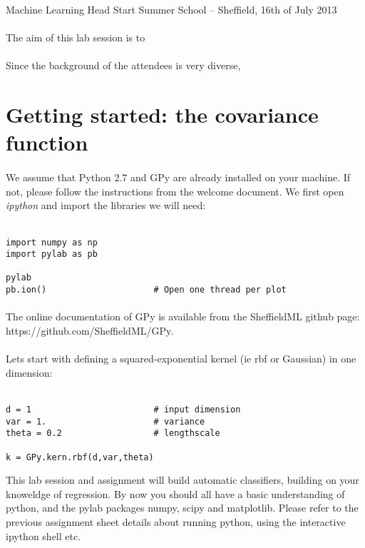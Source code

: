 \documentclass{article}
\begin{document}
\begin{center}
\textcolor{MyDarkBlue}{
{\LARGE Machine Learning}
\vspace*{.5cm}
{\large Head Start Summer School -- Sheffield, 16th of July 2013}
}
\end{center}
\vspace*{1cm}

\paragraph{}
The aim of this lab session is to 

\paragraph{}
Since the background of the attendees is very diverse, 

\section{Getting started: the covariance function}
\paragraph{}
We assume that Python 2.7 and GPy are already installed on your machine. If not, please follow the instructions from the welcome document. We first open \textit{ipython} and import the libraries we will need: \\ \ \\
\begin{verbatim}
import numpy as np
import pylab as pb

pylab
pb.ion()                     # Open one thread per plot
\end{verbatim}

\paragraph{}
The online documentation of GPy is available from the SheffieldML github page: https://github.com/SheffieldML/GPy.

\paragraph{}
Lets start with defining a squared-exponential kernel (ie rbf or Gaussian) in one dimension: \\ \ \\
\begin{verbatim}
d = 1                        # input dimension
var = 1.                     # variance
theta = 0.2                  # lengthscale

k = GPy.kern.rbf(d,var,theta)
\end{verbatim}
This lab session and assignment will build automatic classifiers, building on your knoweldge of regression. By now you should all have a basic understanding of python, and the pylab packages numpy, scipy and matplotlib. Please refer to the previous assignment sheet details about running python, using the interactive ipython shell etc.
\end{document}
